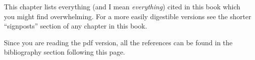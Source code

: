 \documentclass[
]{book}
\begin{document}
This chapter lists everything (and I mean \emph{everything}) cited in this book which you might find overwhelming. For a more easily digestible versions see the shorter ``signposts'' section of any chapter in this book.

Since you are reading the pdf version, all the references can be found in the bibliography section following this page.

  
\end{document}
